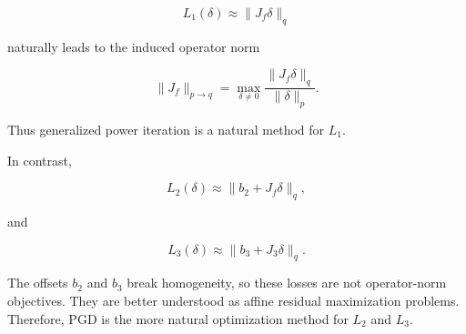 \documentclass{article}
\begin{document}
\[
L_1(\delta)
\approx
\|J_f\delta\|_q
\]

naturally leads to the induced operator norm

\[
\|J_f\|_{p\to q}
=
\max_{\delta\neq0}
\frac{\|J_f\delta\|_q}{\|\delta\|_p}.
\]

Thus generalized power iteration is a natural method for \(L_1\).

In contrast,

\[
L_2(\delta)
\approx
\|b_2+J_f\delta\|_q,
\]

and

\[
L_3(\delta)
\approx
\|b_3+J_3\delta\|_q.
\]

The offsets \(b_2\) and \(b_3\) break homogeneity, so these losses are not operator-norm objectives. They are better understood as affine residual maximization problems. Therefore, PGD is the more natural optimization method for \(L_2\) and \(L_3\).

\clearpage
\end{document}
